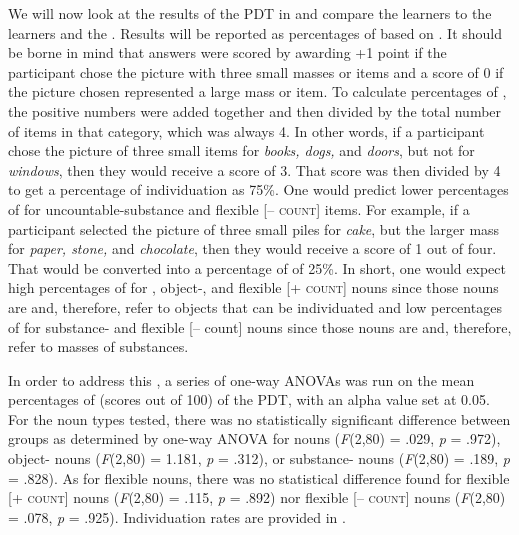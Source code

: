 \documentclass[output=paper]{langsci/langscibook}
\begin{document}
We will now look at the results of the PDT in  and compare the  learners to the  learners and the . Results will be reported as percentages of  based on  . It should be borne in mind that answers were scored by awarding +1 point if the participant chose the picture with three small masses or items and a score of 0 if the picture chosen represented a large mass or item. To calculate percentages of , the positive numbers were added together and then divided by the total number of items in that category, which was always 4. In other words, if a participant chose the picture of three small items for \textit{books, dogs,} and \textit{doors}, but not for \textit{windows}, then they would receive a score of 3. That score was then divided by 4 to get a percentage of individuation as 75\%. One would predict lower percentages of  for uncountable-substance and flexible [\textsc{– count}] items. For example, if a participant selected the picture of three small piles for \textit{cake}, but the larger mass for \textit{paper, stone,} and \textit{chocolate}, then they would receive a score of 1 out of four. That would be converted into a percentage of  of 25\%. In short, one would expect high percentages of  for , object-, and flexible [\textsc{+ count}] nouns since those nouns are  and, therefore, refer to objects that can be individuated and low percentages of  for substance- and flexible [– count] nouns since those nouns are  and, therefore, refer to masses of substances. 

In order to address this , a series of one-way ANOVAs was run on the mean percentages of  (scores out of 100) of the PDT, with an alpha value set at 0.05. For the noun types tested, there was no statistically significant difference between groups as determined by one-way ANOVA for  nouns (\textit{F}(2,80) = .029, \textit{p} = .972), object- nouns (\textit{F}(2,80) = 1.181, \textit{p} = .312), or substance- nouns (\textit{F}(2,80) = .189, \textit{p} = .828). As for flexible nouns, there was no statistical difference found for flexible [\textsc{+ count}] nouns (\textit{F}(2,80) = .115, \textit{p} = .892) nor flexible [\textsc{– count}] nouns (\textit{F}(2,80) = .078, \textit{p} = .925). Individuation rates are provided in .
 
\end{document}

